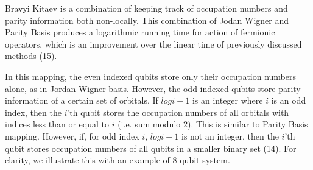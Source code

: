 \documentclass{article}
\begin{document}
    Bravyi Kitaev is a combination of keeping track of occupation numbers and
    parity information both non-locally. This combination of Jodan Wigner and
    Parity Basis produces a logarithmic running time for action of fermionic
    operators, which is an improvement over the linear time of previously
    discussed methods (15).

    In this mapping, the even indexed qubits store only their occupation
    numbers alone, as in Jordan Wigner basis. However, the odd indexed
    qubits store parity information of a certain set of orbitals. If
    \(log{i+1}\) is an integer where \(i\) is an odd index, then the
    \(i\)'th qubit stores the occupation numbers of all orbitals with
    indices less than or equal to  \(i\) (i.e. sum modulo 2). This is similar to Parity Basis mapping. However,
    if, for odd index \(i\), \(log{i+1}\) is not an integer, then the
    \(i\)'th qubit stores occupation numbers of all qubits in a smaller
    binary set (14). For clarity, we illustrate this with an example of
    8 qubit system.
\end{document}
